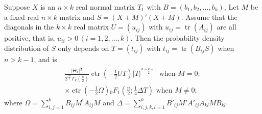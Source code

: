 \documentclass[10pt,a4paper]{amsart}
\begin{document}
\begin{theorem} \label{thm: main theorem}  Suppose $X$ is an $n\times k$  real normal matrix $T_1$ with $B = ( b_{1}, b_{2},\dots, b_k)$,
Let $ M$ be a fixed real $n\times k$ matrix and $ S =  (X +  M)'(X +  M)$. Assume that the diagonals in the $k\times k$ real matrix $ U = (u_{ij})$ with $u_{ij} = \operatorname{tr}( A_{ij})$ are all positive, that is, $u_{ii}>0 \, (i=1,2,\dots,k)$. Then the probability density distribution of $ S$ only depends on $ T %
= (t_{ij})$ with 
    $t_{ij} = \operatorname{tr}( B_{ij}  S)$ when $n > k - 1$, and is 
        \begin{eqnarray}
         \frac{| \varTheta_{1}|^{\frac{1}{2}}}{2^{\frac{nk}{2}}\varGamma_{k}(\frac{n}{2})} \operatorname{etr} \left(-\frac{1}{2}  U T \right) | T|^{\frac{n-k-1}{2}}          \text{ when } {M}=0; \\
                \times \operatorname{etr} \left(-\frac{1}{2}  \varOmega\right){}_{0}F_{1}\left(\frac{n}{2};\frac{1}{4} \varDelta  T\right) \text{ when } {M}\neq0;
        \end{eqnarray}
        where $\varOmega = \sum_{i,j=1}^{k} B_{ij}  M^{\prime}   A_{ij}  M$ and $ \varDelta = \sum_{i,j,k,l=1}^{k} B'_{ij} M'A'_{ij}A_{kl} M B_{kl}$.
\end{theorem}
\end{document}
